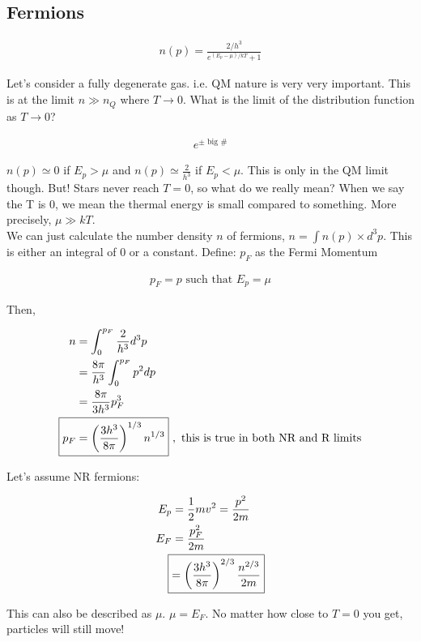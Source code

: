 \documentclass[10pt,letterpaper,final]{book}
\newcommand{\rp}{\right)}
\newcommand{\lp}{\left(}
\begin{document}
\subsection{Fermions}

\begin{align}
n(p)= \frac{2/h^3}{e^{(E_p - \mu)/kT} + 1}
\end{align}

Let's consider a fully degenerate gas. i.e. QM nature is very very important. This is at the limit $n \gg n_Q$ where $T \rightarrow 0$. What is the limit of the distribution function as $T \rightarrow 0$? 

\begin{align}
e^{\pm \text{ big \#}}
\end{align}

$n(p) \simeq 0 $ if $E_p > \mu$ and $n(p) \simeq \frac{2}{h^3} $ if $E_p < \mu$. This is only in the QM limit though. But! Stars never reach $T = 0$, so what do we really mean? When we say the T is 0, we mean the thermal energy is small compared to something. More precisely, $\mu \gg kT$. \\

We can just calculate the number density $n$ of fermions, $n = \int n(p) \times d^3p$. This is either an integral of 0 or a constant. Define: $p_F$ as the Fermi Momentum

\begin{align}
p_F = p \text{ such that }E_p = \mu
\end{align}

Then, 

\begin{align}
n &= \int_{0}^{p_F} \frac{2}{h^3}d^3p\\
&= \frac{8 \pi}{h^3} \int_0^{p_F} p^2 dp\\
&= \frac{8 \pi}{3h^3} p_F^3\\
\Aboxed{p_F &= \lp \frac{3h^3}{8 \pi} \rp^{1/3} n^{1/3}}~,\text{ this is true in both NR and R limits}
\end{align}

Let's assume NR fermions:

\begin{align}
E_p &= \frac{1}{2}mv^2 = \frac{p^2}{2m}\\
E_F &= \frac{p_F^2}{2m}\\
\Aboxed{&= \lp \frac{3h^3}{8 \pi} \rp ^{2/3} \frac{n^{2/3}}{2m} }
\end{align}

This can also be described as $\mu$. $\boxed{\mu = E_F}$. No matter how close to $T=0$ you get, particles will still move!
\end{document}
